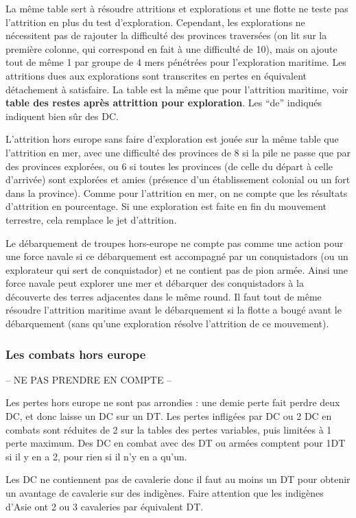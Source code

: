 La même table sert à résoudre attritions et explorations et une flotte
ne teste pas l'attrition en plus du test d'exploration. Cependant,
les explorations ne nécessitent pas de rajouter la difficulté des
provinces traversées (on lit sur la première colonne, qui correspond en
fait à une difficulté de 10), mais on ajoute tout de même 1 par groupe de 
4 mers pénétrées pour l'exploration maritime.
Les attritions dues aux explorations 
sont transcrites en pertes en équivalent détachement à satisfaire. La table
est la même que pour l'attrition maritime, voir \textbf{table des restes après
attrittion pour exploration}. Les ``de'' indiqués indiquent bien sûr des DC.

L'attrition hors europe sans faire d'exploration est jouée sur la même table
que l'attrition en mer, avec une difficulté des provinces de 8 si la pile ne passe
que par des provinces explorées, ou 6 si toutes les provinces (de celle du
départ à celle d'arrivée) sont explorées et amies (présence d'un établissement
colonial ou un fort dans la province).
Comme pour l'attrition en mer, on ne compte que les résultats d'attrition en 
pourcentage.
Si une exploration est faite en fin du mouvement terrestre, cela remplace le jet d'attrition.

Le débarquement de troupes hors-europe ne compte pas comme une action
pour une force navale si ce débarquement est accompagné par un
conquistadors (ou un explorateur qui sert de conquistador) et ne contient pas
de pion armée. Ainsi une force navale peut explorer une mer et débarquer
des conquistadors à la découverte des terres adjacentes dans le même round.
Il faut tout de même résoudre l'attrition maritime avant le débarquement si
la flotte a bougé avant le débarquement (sans qu'une exploration résolve
l'attrition de ce mouvement).

\subsubsection{Les combats hors europe}
-- NE PAS PRENDRE EN COMPTE --

Les pertes hors europe ne sont pas arrondies : une demie perte fait perdre deux DC,
et donc laisse un DC sur un DT. Les pertes infligées par DC ou 2 DC en combats sont
réduites de 2 sur la tables des pertes variables, puis limitées à 1 perte maximum.
Des DC en combat avec des DT ou armées comptent pour 1DT  si il y en a 2,
pour rien si il n'y en a qu'un.

Les DC ne contiennent pas de cavalerie donc il faut au moins un DT
pour obtenir un avantage de cavalerie sur des indigènes. Faire attention
que les indigènes d'Asie ont 2 ou 3 cavaleries par équivalent DT.

